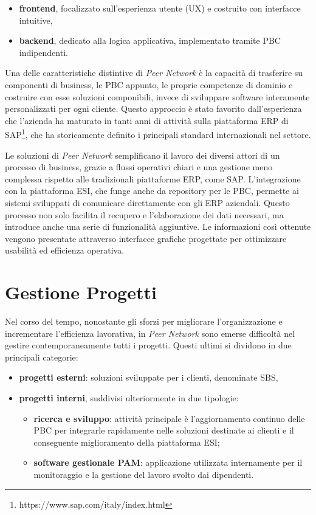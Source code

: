 \begin{itemize}
    \item \textbf{frontend}, focalizzato sull’esperienza utente (UX) e costruito con interfacce intuitive,
    \item \textbf{backend}, dedicato alla logica applicativa, implementato tramite \ac{PBC} indipendenti.
\end{itemize}

Una delle caratteristiche distintive di \textit{Peer Network} è la capacità di trasferire su componenti di business, le \ac{PBC} appunto, le proprie
competenze di dominio e costruire con esse soluzioni componibili, invece di sviluppare software interamente personalizzati per ogni cliente.
Questo approccio è stato favorito dall’esperienza che l’azienda ha maturato in tanti anni di attività sulla piattaforma \ac{ERP} di
SAP\footnote{https://www.sap.com/italy/index.html}, che ha storicamente definito i principali standard internazionali nel settore.

Le soluzioni di \textit{Peer Network} semplificano il lavoro dei diversi attori di un processo di business, grazie a flussi operativi chiari e una
gestione meno complessa rispetto alle tradizionali piattaforme \ac{ERP}, come SAP. L'integrazione con la piattaforma \ac{ESI}, che funge anche da
repository per le \ac{PBC}, permette ai sistemi sviluppati di comunicare direttamente con gli \ac{ERP} aziendali. Questo processo non solo facilita
il recupero e l'elaborazione dei dati necessari, ma introduce anche una serie di funzionalità aggiuntive. Le informazioni così ottenute vengono
presentate attraverso interfacce grafiche progettate per ottimizzare usabilità ed efficienza operativa.

\section{Gestione Progetti}
\label{sec:pm}
Nel corso del tempo, nonostante gli sforzi per migliorare l’organizzazione e incrementare l’efficienza lavorativa, in \textit{Peer Network} sono
emerse difficoltà nel gestire contemporaneamente tutti i progetti. Questi ultimi si dividono in due principali categorie:

\begin{itemize}
    \item \textbf{progetti esterni}: soluzioni sviluppate per i clienti, denominate \ac{SBS},
    \item \textbf{progetti interni}, suddivisi ulteriormente in due tipologie:
        \begin{itemize}
            \item \textbf{ricerca e sviluppo}: attività principale è l'aggiornamento continuo delle \ac{PBC} per integrarle
            rapidamente nelle soluzioni destinate ai clienti e il conseguente miglioramento della piattaforma \ac{ESI};
            \item \textbf{software gestionale \ac{PAM}}: applicazione utilizzata internamente per il monitoraggio e la gestione del lavoro svolto dai dipendenti.
        \end{itemize}
\end{itemize}

